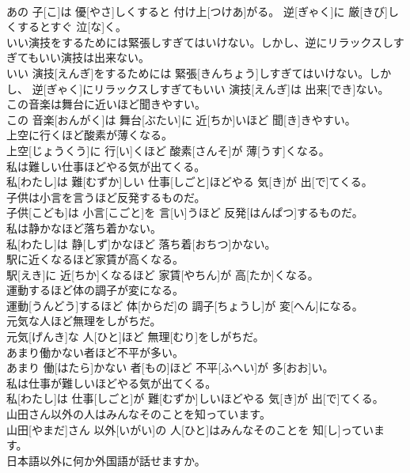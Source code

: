 \documentclass[8pt]{extreport}
\begin{document}
\begin{CJK}{UTF8}{min}
\\	あの 子[こ]は 優[やさ]しくすると 付け上[つけあ]がる。 逆[ぎゃく]に 厳[きび]しくするとすぐ 泣[な]く。
\\	いい演技をするためには緊張しすぎてはいけない。しかし、逆にリラックスしすぎてもいい演技は出来ない。	
\\	いい 演技[えんぎ]をするためには 緊張[きんちょう]しすぎてはいけない。しかし、 逆[ぎゃく]にリラックスしすぎてもいい 演技[えんぎ]は 出来[でき]ない。
\\	この音楽は舞台に近いほど聞きやすい。	
\\	この 音楽[おんがく]は 舞台[ぶたい]に 近[ちか]いほど 聞[き]きやすい。
\\	上空に行くほど酸素が薄くなる。	
\\	上空[じょうくう]に 行[い]くほど 酸素[さんそ]が 薄[うす]くなる。
\\	私は難しい仕事ほどやる気が出てくる。	
\\	私[わたし]は 難[むずか]しい 仕事[しごと]ほどやる 気[き]が 出[で]てくる。
\\	子供は小言を言うほど反発するものだ。	
\\	子供[こども]は 小言[こごと]を 言[い]うほど 反発[はんぱつ]するものだ。
\\	私は静かなほど落ち着かない。	
\\	私[わたし]は 静[しず]かなほど 落ち着[おちつ]かない。
\\	駅に近くなるほど家賃が高くなる。	
\\	駅[えき]に 近[ちか]くなるほど 家賃[やちん]が 高[たか]くなる。
\\	運動するほど体の調子が変になる。	
\\	運動[うんどう]するほど 体[からだ]の 調子[ちょうし]が 変[へん]になる。
\\	元気な人ほど無理をしがちだ。	
\\	元気[げんき]な 人[ひと]ほど 無理[むり]をしがちだ。
\\	あまり働かない者ほど不平が多い。	
\\	あまり 働[はたら]かない 者[もの]ほど 不平[ふへい]が 多[おお]い。
\\	私は仕事が難しいほどやる気が出てくる。	
\\	私[わたし]は 仕事[しごと]が 難[むずか]しいほどやる 気[き]が 出[で]てくる。
\\	山田さん以外の人はみんなそのことを知っています。	
\\	山田[やまだ]さん 以外[いがい]の 人[ひと]はみんなそのことを 知[し]っています。
\\	日本語以外に何か外国語が話せますか。	

\end{CJK}
\end{document}
